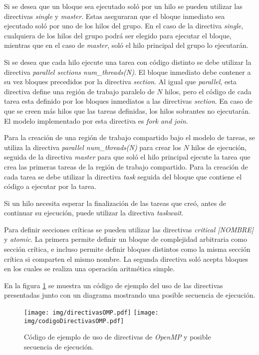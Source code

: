 Si se desea que un bloque sea ejecutado soló por un hilo se pueden utilizar las
directivas \emph{single} y \emph{master}. Estas aseguraran que el bloque
inmediato sea ejecutado soló por uno de los hilos del grupo. En el caso de la
directiva \emph{single}, cualquiera de los hilos del grupo podrá ser elegido
para ejecutar el bloque, mientras que en el caso de \emph{master}, soló el
hilo principal del grupo lo ejecutarán.

Si se desea que cada hilo ejecute una tarea con código distinto se debe utilizar
la directiva \emph{parallel sections num\_threads(N)}. El bloque inmediato debe
contener a su vez bloques precedidos por la directiva \emph{section}. Al igual
que \emph{parallel}, esta directiva define una región de trabajo paralelo de $N$
hilos, pero el código de cada tarea esta definido por los bloques inmediatos a
las directivas \emph{section}. En caso de que se creen más hilos que las tareas
definidas, los hilos sobrantes no ejecutarán. El modelo implementado por esta
directiva es \emph{fork and join}.

Para la creación de una región de trabajo compartido bajo el modelo de tareas, se
utiliza la directiva \emph{parallel num\_threads(N)} para crear los $N$ hilos de
ejecución, seguida de la directiva \emph{master} para que soló el hilo principal
ejecute la tarea que crea las primeras tareas de la región de trabajo
compartido. Para la creación de cada tarea se debe utilizar la directiva
\emph{task} seguida del bloque que contiene el código a ejecutar por la tarea.

Si un hilo necesita esperar la finalización de las tareas que creó, antes de
continuar su ejecución, puede utilizar la directiva \emph{taskwait}.

Para definir secciones críticas se pueden utilizar las directivas \emph{critical
[NOMBRE]} y \emph{atomic}. La primera permite definir un bloque de complejidad
arbitraria como sección crítica, e incluso permite definir bloques distintos
como la misma sección crítica si comparten el mismo nombre. La segunda directiva
soló acepta bloques en los cuales se realiza una operación aritmética simple.

En la figura \ref{directivas} se muestra un código de ejemplo del uso de las
directivas presentadas junto con un diagrama mostrando una posible secuencia
de ejecución.

\begin{figure}[h]

	\centering

	\texttt{[image: img/directivasOMP.pdf]}
	\texttt{[image: img/codigoDirectivasOMP.pdf]}

	\caption{Código de ejemplo de uso de directivas de \emph{OpenMP} y
	posible secuencia de ejecución.}

	\label{directivas}

\end{figure}
